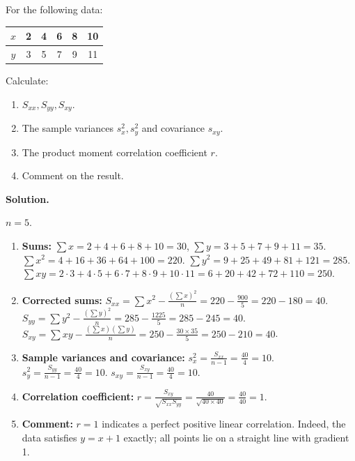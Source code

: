 \documentclass[11pt]{article}
\begin{document}
\begin{exoresolu}
For the following data:
\begin{center}
\begin{tabular}{|c|c|c|c|c|c|}
\hline
$x$ & 2 & 4 & 6 & 8 & 10 \\
\hline
$y$ & 3 & 5 & 7 & 9 & 11 \\
\hline
\end{tabular}
\end{center}
Calculate:
\begin{enumerate}
\item $S_{xx}, S_{yy}, S_{xy}$.
\item The sample variances $s_x^2, s_y^2$ and covariance $s_{xy}$.
\item The product moment correlation coefficient $r$.
\item Comment on the result.
\end{enumerate}
\tcblower
\textbf{Solution.}

$n=5$.

\begin{enumerate}
\item \textbf{Sums:}
$\sum x = 2+4+6+8+10 = 30$, $\sum y = 3+5+7+9+11 = 35$.
$\sum x^2 = 4+16+36+64+100 = 220$.
$\sum y^2 = 9+25+49+81+121 = 285$.
$\sum xy = 2\cdot3 + 4\cdot5 + 6\cdot7 + 8\cdot9 + 10\cdot11 = 6+20+42+72+110 = 250$.

\item \textbf{Corrected sums:}
$S_{xx} = \sum x^2 - \frac{(\sum x)^2}{n} = 220 - \frac{900}{5} = 220 - 180 = 40$.
$S_{yy} = \sum y^2 - \frac{(\sum y)^2}{n} = 285 - \frac{1225}{5} = 285 - 245 = 40$.
$S_{xy} = \sum xy - \frac{(\sum x)(\sum y)}{n} = 250 - \frac{30\times35}{5} = 250 - 210 = 40$.

\item \textbf{Sample variances and covariance:}
$s_x^2 = \frac{S_{xx}}{n-1} = \frac{40}{4} = 10$.
$s_y^2 = \frac{S_{yy}}{n-1} = \frac{40}{4} = 10$.
$s_{xy} = \frac{S_{xy}}{n-1} = \frac{40}{4} = 10$.

\item \textbf{Correlation coefficient:}
$r = \frac{S_{xy}}{\sqrt{S_{xx}S_{yy}}} = \frac{40}{\sqrt{40\times40}} = \frac{40}{40} = 1$.

\item \textbf{Comment:} $r=1$ indicates a perfect positive linear correlation. Indeed, the data satisfies $y = x+1$ exactly; all points lie on a straight line with gradient 1.
\end{enumerate}
\end{exoresolu}
\end{document}
